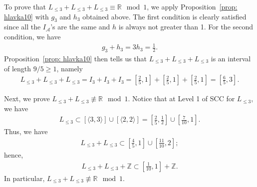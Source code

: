 \documentclass{ws-ijnt}
\begin{document}
	To prove that $L_{\leq 3}+L_{\leq 3}+L_{\leq 3}\equiv\mathbb{R}\mod1$, we apply Proposition~\ref{prop: hlavka10} with $g_3$ and $h_3$ obtained above. The first condition is clearly satisfied since all the $I_{\mathcal{A}}$'s are the same and $h$ is always not greater than 1. For the second condition, we have
	\begin{align*}
		g_3+h_3
		=3h_3
		=\frac{1}{2}.
	\end{align*}
	Proposition~\ref{prop: hlavka10} then tells us that $L_{\leq 3}+L_{\leq 3}+L_{\leq 3}$ is an interval of length $9/5\geq 1$, namely
	\begin{align*}
		L_{\leq 3}+L_{\leq 3}+L_{\leq 3}
		=I_3+I_3+I_3
		= \left[\frac{2}{5},1\right]+\left[\frac{2}{5},1\right]+\left[\frac{2}{5},1\right]
		= \left[\frac{6}{5},3\right].
	\end{align*}
	
	Next, we prove $L_{\leq 3}+L_{\leq 3}\not\equiv\mathbb{R}\mod1$. Notice that at Level 1 of SCC for $L_{\leq 3}$, we have
	\begin{align*}
		L_{\leq 3}
		\subset[\langle3,3\rangle]\cup[\langle2,2\rangle]
		=\left[\frac{2}{5},\frac{1}{2}\right]\cup\left[\frac{7}{10},1\right].
	\end{align*}
	Thus, we have
	\begin{align*}
		L_{\leq 3}+L_{\leq 3}\subset \left[\frac{4}{5},1\right]\cup\left[\frac{11}{10},2\right];
	\end{align*}
	hence,
	\begin{align*}
		L_{\leq 3}+L_{\leq 3}+\mathbb{Z}\subset\left[\frac{1}{10},1\right]+\mathbb{Z}.
	\end{align*}
	In particular, $L_{\leq 3}+L_{\leq 3}\not\equiv\mathbb{R}\mod1$.
	
\end{document}
